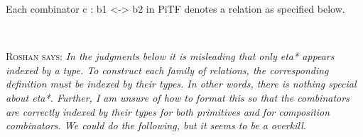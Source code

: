 \documentclass{llncs}
\newcommand{\roshan}[1]{\textsc{Roshan says:} 
  \textit{#1}
}
\begin{document}
\begin{definition}
\label{def:relational-PiTF}
Each combinator {{c : b1 <-> b2}} in {{PiTF}} denotes a relation
as specified below. 
%
%
%
%
%
%
%
%
%
%
%
%
\end{definition}

\newpage
~
\newpage


\roshan{In the judgments below it is misleading that only {{eta*}}
  appears indexed by a type. To construct each family of relations,
  the corresponding definition must be indexed by their types. In
  other words, there is nothing special about {{eta*}}. Further, I am
  unsure of how to format this so that the combinators are correctly
  indexed by their types for both primitives and for composition
  combinators. We could do the following, but it seems to be a
  overkill.}

\end{document}
